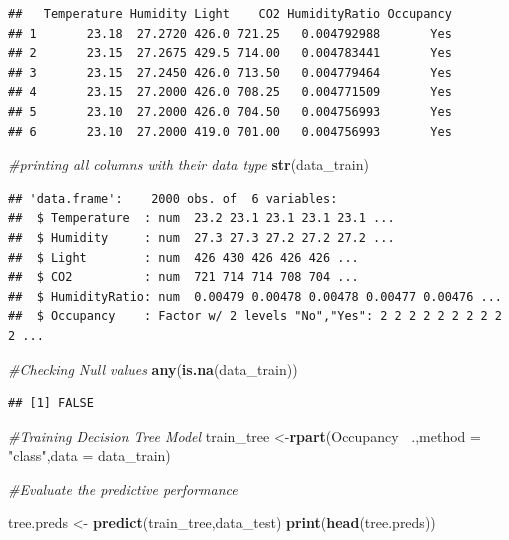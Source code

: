 \documentclass[]{article}
\newenvironment{Shaded}{\begin{snugshade}}{\end{snugshade}}
\newcommand{\CommentTok}[1]{\textcolor[rgb]{0.56,0.35,0.01}{\textit{#1}}}
\newcommand{\DataTypeTok}[1]{\textcolor[rgb]{0.13,0.29,0.53}{#1}}
\newcommand{\KeywordTok}[1]{\textcolor[rgb]{0.13,0.29,0.53}{\textbf{#1}}}
\newcommand{\NormalTok}[1]{#1}
\newcommand{\OperatorTok}[1]{\textcolor[rgb]{0.81,0.36,0.00}{\textbf{#1}}}
\newcommand{\StringTok}[1]{\textcolor[rgb]{0.31,0.60,0.02}{#1}}
\begin{document}
\begin{verbatim}
##   Temperature Humidity Light    CO2 HumidityRatio Occupancy
## 1       23.18  27.2720 426.0 721.25   0.004792988       Yes
## 2       23.15  27.2675 429.5 714.00   0.004783441       Yes
## 3       23.15  27.2450 426.0 713.50   0.004779464       Yes
## 4       23.15  27.2000 426.0 708.25   0.004771509       Yes
## 5       23.10  27.2000 426.0 704.50   0.004756993       Yes
## 6       23.10  27.2000 419.0 701.00   0.004756993       Yes
\end{verbatim}

\begin{Shaded}
\begin{Highlighting}[]
\CommentTok{#printing all columns with their data type}
\KeywordTok{str}\NormalTok{(data_train)}
\end{Highlighting}
\end{Shaded}

\begin{verbatim}
## 'data.frame':    2000 obs. of  6 variables:
##  $ Temperature  : num  23.2 23.1 23.1 23.1 23.1 ...
##  $ Humidity     : num  27.3 27.3 27.2 27.2 27.2 ...
##  $ Light        : num  426 430 426 426 426 ...
##  $ CO2          : num  721 714 714 708 704 ...
##  $ HumidityRatio: num  0.00479 0.00478 0.00478 0.00477 0.00476 ...
##  $ Occupancy    : Factor w/ 2 levels "No","Yes": 2 2 2 2 2 2 2 2 2 2 ...
\end{verbatim}

\begin{Shaded}
\begin{Highlighting}[]
\CommentTok{#Checking Null values}
\KeywordTok{any}\NormalTok{(}\KeywordTok{is.na}\NormalTok{(data_train))}
\end{Highlighting}
\end{Shaded}

\begin{verbatim}
## [1] FALSE
\end{verbatim}

\begin{Shaded}
\begin{Highlighting}[]
\CommentTok{#Training Decision Tree Model}
\NormalTok{train_tree <-}\KeywordTok{rpart}\NormalTok{(Occupancy }\OperatorTok{~}\NormalTok{.,}\DataTypeTok{method =} \StringTok{"class"}\NormalTok{,}\DataTypeTok{data =}\NormalTok{ data_train)}

\CommentTok{#Evaluate the predictive performance}

\NormalTok{tree.preds <-}\StringTok{ }\KeywordTok{predict}\NormalTok{(train_tree,data_test) }
\KeywordTok{print}\NormalTok{(}\KeywordTok{head}\NormalTok{(tree.preds))}
\end{Highlighting}
\end{Shaded}
\end{document}
